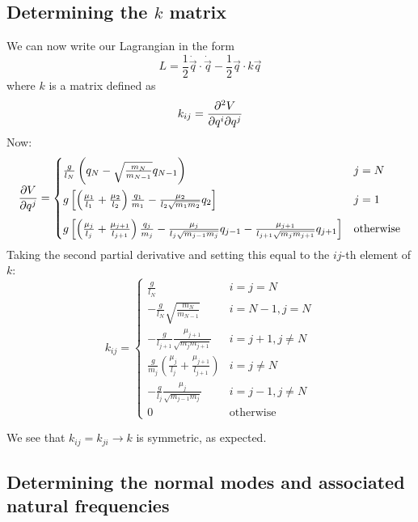 \documentclass[12pt]{article}
\begin{document}
	\subsection{Determining the $k$ matrix}
	We can now write our Lagrangian in the form
	$$L=\frac{1}{2}\dot{\vec{q}}\cdot\dot{\vec{q}}-\frac{1}{2}\vec{q}\cdot k\vec{q}$$
	where $k$ is a matrix defined as
	$$k_{ij}=\pdv{V}{q^i}{q^j}$$
	Now:
	$$\pdv{V}{q^j}=\begin{cases} 
      \frac{g}{l_N}\left(q_N-\sqrt{\frac{m_N}{m_{N-1}}}q_{N-1}\right) & j=N \\[10pt]
	  g\left[\left(\frac{\mu_1}{l_1}+\frac{\mu_{2}}{l_{2}}\right)\frac{q_1}{m_1}-\frac{\mu_{2}}{l_{2}\sqrt{m_1m_{2}}}q_{2}\right] & j = 1\\[10pt]
      g\left[\left(\frac{\mu_j}{l_j}+\frac{\mu_{j+1}}{l_{j+1}}\right)\frac{q_j}{m_j}-\frac{\mu_j}{l_j\sqrt{m_{j-1}m_j}}q_{j-1}-\frac{\mu_{j+1}}{l_{j+1}\sqrt{m_jm_{j+1}}}q_{j+1}\right] & \mbox{otherwise} 
   \end{cases}$$
   Taking the second partial derivative and setting this equal to the $ij$-th element of $k$:
   $$k_{ij}=\begin{cases}
   
     \frac{g}{l_N} & i = j = N \\[10pt]
     
     -\frac{g}{l_N}\sqrt{\frac{m_N}{m_{N-1}}} & i = N-1, j = N \\[10pt]
     
     -\frac{g}{l_{j+1}}\frac{\mu_{j+1}}{\sqrt{m_jm_{j+1}}} & i = j + 1, j\neq N \\[10pt]
     
     \frac{g}{m_j}\left(\frac{\mu_j}{l_j}+\frac{\mu_{j+1}}{l_{j+1}}\right) & i = j \neq N \\[10pt]
     
     -\frac{g}{l_{j}}\frac{\mu_{j}}{\sqrt{m_{j-1}m_{j}}} & i = j - 1, j\neq N \\[10pt]
     
     0 & \mbox{otherwise}
   
  \end{cases}$$
	
	We see that $k_{ij}=k_{ji}\rightarrow k$ is symmetric, as expected.
	
	\subsection{Determining the normal modes and associated natural frequencies}
	
\end{document}
